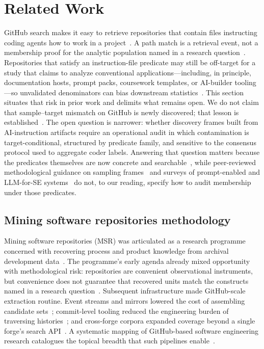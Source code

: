 \section{Related Work}
\label{sec:related-work}

GitHub search makes it easy to retrieve repositories that contain files instructing coding agents how to work in a project~\cite{agentsmd2025,cursor2024docs,brown2024copilot,claude2024docs,anthropic2024mcp}.
A path match is a retrieval event, not a membership proof for the analytic population named in a research question~\cite{kalliamvakou2015indepth,baltes2022sampling}.
Repositories that satisfy an instruction-file predicate may still be off-target for a study that claims to analyze conventional applications---including, in principle, documentation hosts, prompt packs, coursework templates, or AI-builder tooling---so unvalidated denominators can bias downstream statistics~\cite{kalliamvakou2015indepth,baltes2022sampling}.
This section situates that risk in prior work and delimits what remains open.
We do not claim that sample--target mismatch on GitHub is newly discovered; that lesson is established~\cite{kalliamvakou2015indepth,baltes2022sampling,howison2004perils}.
The open question is narrower: whether discovery frames built from AI-instruction artifacts require an operational audit in which contamination is target-conditional, structured by predicate family, and sensitive to the consensus protocol used to aggregate coder labels.
Answering that question matters because the predicates themselves are now concrete and searchable~\cite{agentsmd2025,cursor2024docs,brown2024copilot,claude2024docs,anthropic2024mcp}, while peer-reviewed methodological guidance on sampling frames~\cite{baltes2022sampling} and surveys of prompt-enabled and LLM-for-SE systems~\cite{chen2025promptware,hou2024llm4se} do not, to our reading, specify how to audit membership under those predicates.

\subsection{Mining software repositories methodology}
\label{subsec:rw-msr}

Mining software repositories (MSR) was articulated as a research programme concerned with recovering process and product knowledge from archival development data~\cite{hassan2008road}.
The programme's early agenda already mixed opportunity with methodological risk: repositories are convenient observational instruments, but convenience does not guarantee that recovered units match the constructs named in a research question~\cite{hassan2008road,wohlin2012}.
Subsequent infrastructure made GitHub-scale extraction routine.
Event streams and mirrors lowered the cost of assembling candidate sets~\cite{gousios2013,gousios2014lean}; commit-level tooling reduced the engineering burden of traversing histories~\cite{spadini2018pydriller}; and cross-forge corpora expanded coverage beyond a single forge's search API~\cite{ma2019woc,pietri2019swh,dicossmo2017softwareheritage}.
A systematic mapping of GitHub-based software engineering research catalogues the topical breadth that such pipelines enable~\cite{cosentino2017mapping}.

